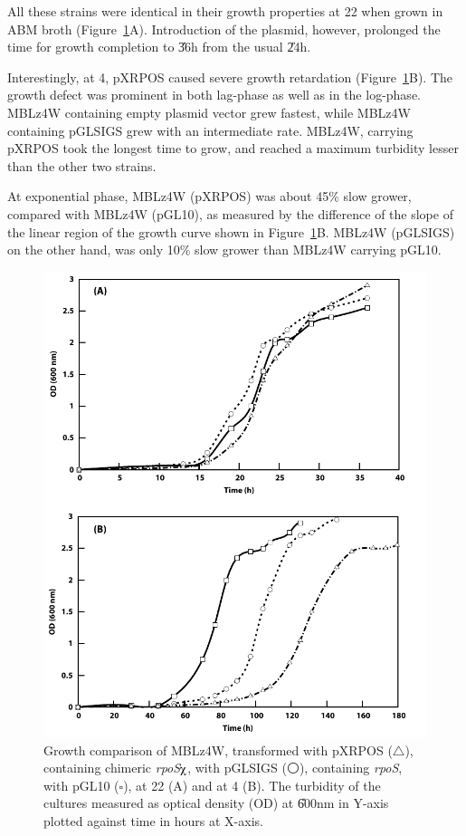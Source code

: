 All these strains were identical in their growth properties at
22\dg{} when grown in ABM broth (Figure~\ref{chi_growth}A).
Introduction of the plasmid, however, prolonged the time for
growth completion to \U{36}{h} from the usual \U{24}{h}.

Interestingly, at 4\dg{}, pXRPOS caused severe growth retardation
(Figure~\ref{chi_growth}B). The growth defect was prominent in
both lag-phase as well as in the log-phase. MBLz4W containing
empty plasmid vector grew fastest, while MBLz4W containing pGLSIGS
grew with an intermediate rate. MBLz4W, carrying pXRPOS took the
longest time to grow, and reached a maximum turbidity lesser than
the other two strains.

At exponential phase, MBLz4W (pXRPOS) was about 45\% slow grower,
compared with MBLz4W (pGL10), as measured by the difference of the
slope of the linear region of the growth curve shown in
Figure~\ref{chi_growth}B\@. MBLz4W (pGLSIGS) on the other hand,
was only 10\% slow grower than MBLz4W carrying pGL10.

\begin{figure}[tbp]
\begin{narrow}{-1in}{-1in}
\centering
\includegraphics{figures/chap6_chimera_growth}
\end{narrow}
\caption[Growth properties of MBLz4W]{Growth comparison of MBLz4W,
transformed with pXRPOS ($\triangle$), containing chimeric
\emph{rpoS}$\chiup$, with pGLSIGS ($\medcirc$), containing
\emph{rpoS}, with pGL10 ($\square$), at 22\dg{} (A)
and at 4\dg{} (B). The turbidity of the cultures measured as
optical density (OD) at \U{600}{nm} in Y-axis plotted against time
in hours at X-axis.} \label{chi_growth}
\end{figure}

